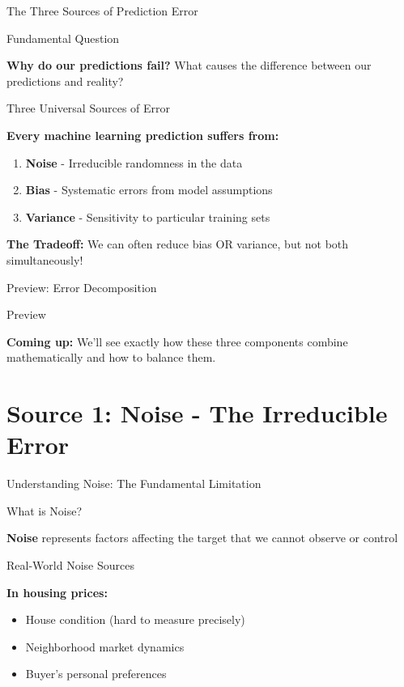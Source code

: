 \documentclass[10pt]{beamer}
\begin{document}
\begin{frame}{The Three Sources of Prediction Error}
\footnotesize
\begin{alertbox}{Fundamental Question}
\raggedright
\textbf{Why do our predictions fail?} What causes the difference between our predictions and reality?
\end{alertbox}

\begin{definitionbox}{Three Universal Sources of Error}
\raggedright
\textbf{Every machine learning prediction suffers from:}
\begin{enumerate}
\item \textbf{Noise} - Irreducible randomness in the data
\item \textbf{Bias} - Systematic errors from model assumptions
\item \textbf{Variance} - Sensitivity to particular training sets
\end{enumerate}
\end{definitionbox}

\begin{keypointsbox}
\raggedright
\textbf{The Tradeoff:} We can often reduce bias OR variance, but not both simultaneously!
\end{keypointsbox}
\end{frame}

\begin{frame}{Preview: Error Decomposition}
\footnotesize
\begin{examplebox}{Preview}
\raggedright
\textbf{Coming up:} We'll see exactly how these three components combine mathematically and how to balance them.
\end{examplebox}
\end{frame}

\section{Source 1: Noise - The Irreducible Error}

\begin{frame}{Understanding Noise: The Fundamental Limitation}
\small
\begin{definitionbox}{What is Noise?}
\raggedright
\textbf{Noise} represents factors affecting the target that we cannot observe or control
\end{definitionbox}

\begin{examplebox}{Real-World Noise Sources}
\raggedright
\textbf{In housing prices:}
\begin{itemize}
\item House condition (hard to measure precisely)
\item Neighborhood market dynamics
\item Buyer's personal preferences
\end{itemize}
\end{examplebox}
\end{frame}
\end{document}
